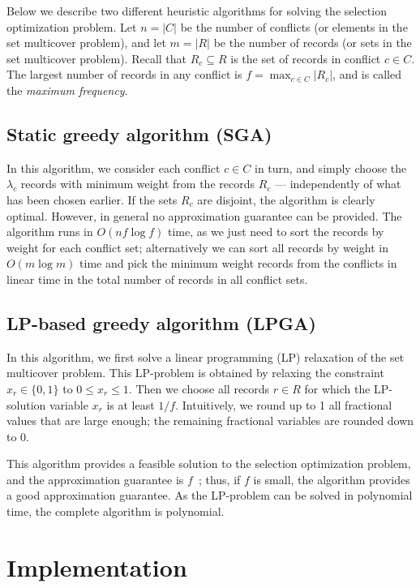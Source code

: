 \documentclass[11pt, oneside]{report}
\begin{document}
{Below we describe two different heuristic algorithms for solving the selection optimization problem. Let $n=|C|$ be the number of conflicts (or elements in the set multicover problem), and let $m=|R|$ be the number of records (or sets in the set multicover problem). Recall that $R_c \subseteq R$ is the set of records in conflict $c \in C$. The largest number of records in any conflict is $f = \max_{c \in C} |R_c|$, and is called the \emph{maximum frequency}.

\subsection{Static greedy algorithm (SGA)}
\label{sec:algorithms:sga}

In this algorithm, we consider each conflict $c \in C$ in turn, and simply choose the $\lambda_c$ records with minimum weight from the records $R_c$ --- independently of what has been chosen earlier. If the sets $R_c$ are disjoint, the algorithm is clearly optimal. However, in general no approximation guarantee can be provided. The algorithm runs in $O(n f \log f)$ time, as we just need to sort the records by weight for each conflict set; alternatively we can sort all records by weight in $O(m \log m)$ time and pick the minimum weight records from the conflicts in linear time in the total number of records in all conflict sets.

\subsection{LP-based greedy algorithm (LPGA)}
\label{sec:algorithms:lpga}

In this algorithm, we first solve a linear programming (LP) relaxation of the set multicover problem. This LP-problem is obtained by relaxing the constraint $x_r \in \{0, 1\}$ to $0 \leq x_r \leq 1$. Then we choose all records $r \in R$ for which the LP-solution variable $x_r$ is at least $1 / f$. Intuitively, we round up to 1 all fractional values that are large enough; the remaining fractional variables are rounded down to 0.

This algorithm provides a feasible solution to the selection optimization problem, and the approximation guarantee is $f$~\cite{vazirani2001approximation}; thus, if $f$ is small, the algorithm provides a good approximation guarantee. As the LP-problem can be solved in polynomial time, the complete algorithm is polynomial.


\section{Implementation}
\label{sec:implementation}

}
\end{document}
